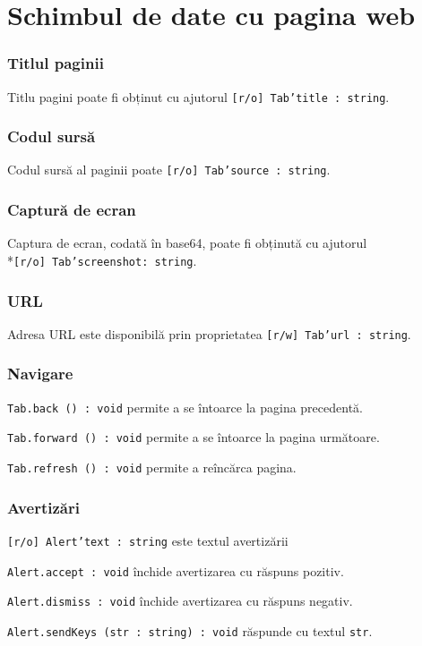 \section{Schimbul de date cu pagina web}
\label{dataexchange}

\subsubsection{Titlul paginii}

Titlu pagini poate fi obținut cu ajutorul \texttt{[r/o] Tab'title : string}.

\subsubsection{Codul sursă}

Codul sursă al paginii poate \texttt{[r/o] Tab'source : string}.

\subsubsection{Captură de ecran}

Captura de ecran, codată în base64, poate fi obținută cu ajutorul \\*\texttt{[r/o] Tab'screenshot: string}.

\subsubsection{URL}

Adresa URL este disponibilă prin proprietatea \texttt{[r/w] Tab'url : string}.

\subsubsection{Navigare}

\texttt{Tab.back () : void} permite a se întoarce la pagina precedentă.

\texttt{Tab.forward () : void} permite a se întoarce la pagina următoare.

\texttt{Tab.refresh () : void}  permite a reîncărca pagina.

\subsubsection{Avertizări}

\texttt{[r/o] Alert'text : string} este textul avertizării

\texttt{Alert.accept : void} închide avertizarea cu răspuns pozitiv.

\texttt{Alert.dismiss : void} închide avertizarea cu răspuns negativ.

\texttt{Alert.sendKeys (str : string) : void} răspunde cu textul \texttt{str}.

